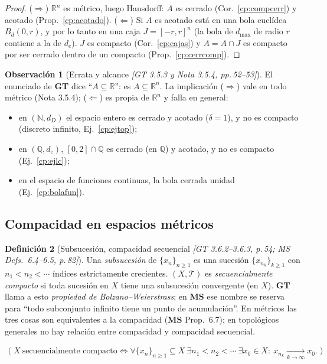 \documentclass[11pt,a4paper]{article}
\newenvironment{lista}{\leavevmode\begin{itemize}[leftmargin=1.5em,itemsep=1pt,topsep=2pt,parsep=0pt]}{\end{itemize}}
\newcommand{\lgc}[1]{\par\vspace{-3pt}\begin{gather*}\big(\;#1\;\big)\end{gather*}\vspace{-6pt}}
\theoremstyle{definition}
\newtheorem{definicion}{Definición}[section]
\newtheorem{observacion}[definicion]{Observación}
\theoremstyle{plain}
\newcommand{\fnt}[1]{{\normalfont\small\itshape\color{gray!150!black}[#1]}}
\newcommand{\R}{\mathbb{R}}
\newcommand{\N}{\mathbb{N}}
\newcommand{\Q}{\mathbb{Q}}
\newcommand{\Bola}[2]{B_d(#1,#2)}
\newcommand{\tp}{\mathcal{T}}
\begin{document}
\begin{proof}
($\Rightarrow$) $\R^n$ es métrico, luego Hausdorff: $A$ es cerrado (Cor.~\ref{cp:compcerr}) y acotado (Prop.~\ref{cp:acotado}). ($\Leftarrow$) Si $A$ es acotado está en una bola euclídea $\Bola{0}{r}$, y por lo tanto en una caja $J=[-r,r]^n$ (la bola de $d_{\max}$ de radio $r$ contiene a la de $d_e$). $J$ es compacto (Cor.~\ref{cp:cajas}) y $A=A\cap J$ es compacto por ser cerrado dentro de un compacto (Prop.~\ref{cp:cerrcomp}).
\end{proof}

\begin{observacion}[Errata y alcance \fnt{GT 3.5.3 y Nota 3.5.4, pp.\,52--53}]
El enunciado de \textbf{GT} dice ``$A\subseteq\R$'': es $A\subseteq\R^n$. La implicación ($\Rightarrow$) vale en todo métrico (Nota 3.5.4); ($\Leftarrow$) es propia de $\R^n$ y falla en general:
\begin{lista}
\item en $(\N,d_D)$ el espacio entero es cerrado y acotado ($\delta=1$), y no es compacto (discreto infinito, Ej.~\ref{cp:ejtop});
\item en $(\Q,d_e)$, $[0,2]\cap\Q$ es cerrado (en $\Q$) y acotado, y no es compacto (Ej.~\ref{cp:ejlc});
\item en el espacio de funciones continuas, la bola cerrada unidad (Ej.~\ref{cp:bolafun}).
\end{lista}
\end{observacion}

\subsection[Compacidad en espacios métricos]{Compacidad en espacios métricos}\label{cp:sub-met}

\begin{definicion}[Subsucesión, compacidad secuencial \fnt{GT 3.6.2--3.6.3, p.\,54; MS Defs.\ 6.4--6.5, p.\,82}]
Una \emph{subsucesión} de $\{x_n\}_{n\ge1}$ es una sucesión $\{x_{n_k}\}_{k\ge1}$ con $n_1<n_2<\cdots$ índices estrictamente crecientes. $(X,\tp)$ es \emph{secuencialmente compacto} si toda sucesión en $X$ tiene una subsucesión convergente (en $X$). \textbf{GT} llama a esto \emph{propiedad de Bolzano--Weierstrass}; en \textbf{MS} ese nombre se reserva para ``todo subconjunto infinito tiene un punto de acumulación''. En métricos las tres cosas son equivalentes a la compacidad (\textbf{MS} Prop.\ 6.7); en topológicos generales no hay relación entre compacidad y compacidad secuencial.
\lgc{X\ \text{secuencialmente compacto}\iff \forall\{x_n\}_{n\ge1}\subseteq X\ \exists n_1<n_2<\cdots\ \exists x_0\in X:\ x_{n_k}\xrightarrow[k\to\infty]{}x_0.}
\end{definicion}
\end{document}
